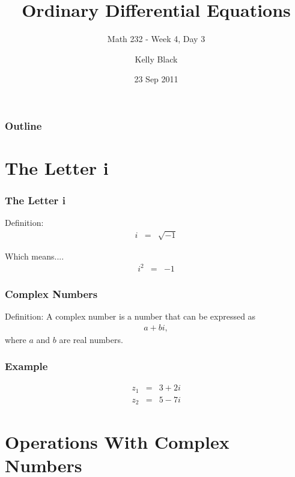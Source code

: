 
\title{Ordinary Differential Equations}
\subtitle{Math 232 - Week 4, Day 3}

\author{Kelly Black}
\date{23 Sep 2011}

\begin{frame}
  \titlepage
\end{frame}

\begin{frame}
  \frametitle{Outline}
\end{frame}


\section{The Letter i}


\begin{frame}
  \frametitle{The Letter i}

  Definition: 
  \begin{eqnarray*}
    i & = & \sqrt{-1} 
  \end{eqnarray*}

  Which means....
  \begin{eqnarray*}
    i^2 & = & -1
  \end{eqnarray*}

\end{frame}


\begin{frame}
  \frametitle{Complex Numbers}

  Definition: A complex number is a  number that can be expressed as
  \begin{eqnarray*}
    a + bi,
  \end{eqnarray*}
  where $a$ and $b$ are real numbers.

\end{frame}



\begin{frame}
  \frametitle{Example}

  \begin{eqnarray*}
    z_1 & = & 3 + 2i \\
    z_2 & = & 5 - 7i
  \end{eqnarray*}

\end{frame}

\section{Operations With Complex Numbers}

